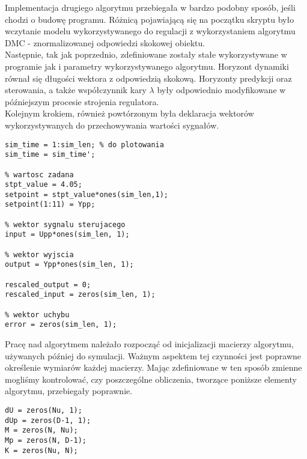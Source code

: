 Implementacja drugiego algorytmu przebiegała w bardzo podobny sposób, jeśli chodzi o budowę programu. Różnicą pojawiającą się na początku skryptu było wczytanie modelu wykorzystywanego do regulacji z wykorzystaniem algorytmu DMC - znormalizowanej odpowiedzi skokowej obiektu.\\
\indent{} Następnie, tak jak poprzednio, zdefiniowane zostały stałe wykorzystywane w programie jak i parametry wykorzystywanego algorytmu. Horyzont dynamiki równał się długości wektora z odpowiedzią skokową. Horyzonty predykcji oraz sterowania, a także współczynnik kary $\lambda$ były odpowiednio modyfikowane w późniejszym procesie strojenia regulatora. \\
\indent{} Kolejnym krokiem, również powtórzonym była deklaracja wektorów wykorzystywanych do przechowywania wartości sygnałów.

\begin{lstlisting}[style=custommatlab,frame=single,label={zad4_vecDMC_lst},caption={Inizjalizacja wektorów używanych do przechowywania sygnałów.},captionpos=b]
% czas symulacji
sim_time = 1:sim_len; % do plotowania
sim_time = sim_time';

% wartosc zadana
stpt_value = 4.05;
setpoint = stpt_value*ones(sim_len,1);
setpoint(1:11) = Ypp;

% wektor sygnalu sterujacego
input = Upp*ones(sim_len, 1);

% wektor wyjscia
output = Ypp*ones(sim_len, 1);

rescaled_output = 0;
rescaled_input = zeros(sim_len, 1);

% wektor uchybu
error = zeros(sim_len, 1);

\end{lstlisting}

Pracę nad algorytmem należało rozpocząć od inicjalizacji macierzy algorytmu, używanych później do symulacji. Ważnym aspektem tej czynności jest poprawne określenie wymiarów każdej macierzy. Mając zdefiniowane w ten sposób zmienne mogliśmy kontrolować, czy poszczególne obliczenia, tworzące poniższe elementy algorytmu, przebiegały poprawnie.
\\

\begin{lstlisting}[style=custommatlab,frame=single,label={zad4_sim_lst},caption={Definicja macierzy algorytmu DMC},captionpos=b]
dU = zeros(Nu, 1);
dUp = zeros(D-1, 1);
M = zeros(N, Nu);
Mp = zeros(N, D-1);
K = zeros(Nu, N);
\end{lstlisting}

